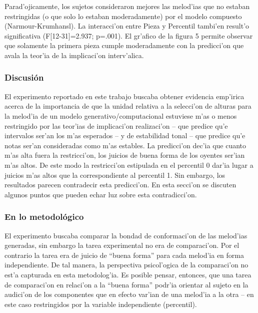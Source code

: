 Parad'ojicamente, los sujetos consideraron mejores las melod'ias que no estaban restringidas (o que solo lo estaban moderadamente) por el modelo compuesto (Narmour-Krumhansl). 
La interacci'on entre Pieza y Percentil tambi'en result'o significativa (F[12-31]=2.937; p=.001). El gr'afico de la figura 5 permite observar que solamente la primera pieza cumple moderadamente con la predicci'on que avala la teor'ia de la implicaci'on interv'alica.


\begin{imagen}
    \width{9cm}
\end{imagen}


\subsubsection{Discusi\'on}
El experimento reportado en este trabajo buscaba obtener evidencia emp'irica acerca de la importancia de que la unidad relativa a la selecci'on de alturas para la 
melod'ia de un modelo generativo/computacional estuviese m'as o menos restringido por las teor'ias de implicaci'on realizaci'on -- que predice qu'e 
intervalos ser'an los m'as esperados -- y de estabilidad tonal -- que predice qu'e notas ser'an consideradas como m'as estables. 
La predicci'on dec'ia que cuanto m'as alta fuera la restricci'on, los juicios de buena forma de los oyentes ser'ian m'as altos. De este modo 
la restricci'on estipulada en el percentil 0 dar'ia lugar a juicios m'as altos que la correspondiente al percentil 1. Sin embargo, los resultados parecen 
contradecir esta predicci'on. En esta secci'on se discuten algunos puntos que pueden echar luz sobre esta contradicci'on. 

\subsubsection{En lo metodol\'ogico}
El experimento buscaba comparar la bondad de conformaci'on de las melod'ias generadas, sin embargo la tarea experimental no era de comparaci'on. Por el contrario la tarea 
era de juicio de ``buena forma'' para cada melod'ia en forma independiente. De tal manera, la perspectiva psicol'ogica de la comparaci'on no est'a capturada en esta 
metodolog'ia. Es posible pensar, entonces, que una tarea de comparaci'on en relaci'on a la ``buena forma'' podr'ia orientar al sujeto en la audici'on de los componentes 
que en efecto var'ian de una melod'ia a la otra -- en este caso restringidos por la variable independiente (percentil).

